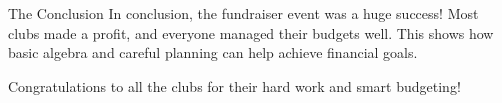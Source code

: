 \documentclass[12pt]{beamer}
\begin{document}
\begin{frame}{The Conclusion}
    In conclusion, the fundraiser event was a huge success! Most clubs made a profit, and everyone managed their budgets well. This shows how basic algebra and careful planning can help achieve financial goals.

    Congratulations to all the clubs for their hard work and smart budgeting!
\end{frame}
\end{document}
